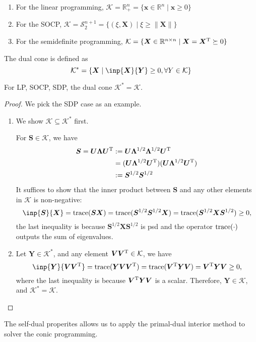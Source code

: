 \begin{enumerate}
\item
For the linear programming, $\mathcal{K}=\mathbb{R}^n_+=\{\bm x\in\mathbb{R}^n\mid\bm x\ge0\}$
\item
For the SOCP, $\mathcal{K}=\mathcal{S}_2^{n+1}=\{(\xi,\bm X)\mid \xi\ge\|\bm X\|\}$
\item
For the semidefinite programming, $\mathcal{K}=\{\bm X\in\mathbb{R}^{n\times n}\mid\bm X=\bm X^{\mathrm T}\succeq0\}$
\end{enumerate}
\begin{definition}
The dual cone is defined as
\[
\mathcal{K}^*=\{\bm X\mid\inp{\bm X}{\bm Y}\ge0,\forall Y\in\mathcal{K}\}
\]
\end{definition}
\begin{proposition}
For LP, SOCP, SDP, the dual cone $\mathcal{K}^*=\mathcal{K}$.
\end{proposition}
\begin{proof}
We pick the SDP case as an example.
\begin{enumerate}
\item
We show $\mathcal{K}\subseteq\mathcal{K}^*$ first. 

For $\bm S\in\mathcal{K}$, we have 
\begin{align*}
\bm S=\bm U\bm\Lambda\bm U^{\mathrm T}
&:=
\bm U\bm\Lambda^{1/2}\bm\Lambda^{1/2}\bm U^{\mathrm T}\\
&=(\bm U\bm\Lambda^{1/2}\bm U^{\mathrm T})(\bm U\bm\Lambda^{1/2}\bm U^{\mathrm T})\\
&:=\bm S^{1/2}\bm S^{1/2}
\end{align*}
It suffices to show that the inner product between $\bm S$ and any other elements in $\mathcal{K}$ is non-negative:
\[
\inp{\bm S}{\bm X}=\trace(\bm S\bm X)=\trace(\bm S^{1/2}\bm S^{1/2}\bm X)=\trace(\bm S^{1/2}\bm X\bm S^{1/2})\ge0,
\]
the last inequality is because $\bm S^{1/2}\bm X\bm S^{1/2}$ is psd and the operator $\operatorname{trace}(\cdot)$ outputs the sum of eigenvalues.
\item
Let $\bm Y\in\mathcal{K}^*$, and any element $\bm V\bm V^{\mathrm T}\in\mathcal{K}$, we have
\[
\inp{\bm Y}{\bm V\bm V\trans}=\trace(\bm Y\bm V\bm V\trans)=\trace(\bm V\trans\bm Y\bm V)=\bm V\trans\bm Y\bm V\ge0,
\]
where the last inequality is because $\bm V^{\mathrm T}\bm Y\bm V$ is a scalar. Therefore, $\bm Y\in\mathcal{K}$, and $\mathcal{K}^*=\mathcal{K}$.
\end{enumerate}
\end{proof}
The self-dual properites allows us to apply the primal-dual interior method to solver the conic programming.

